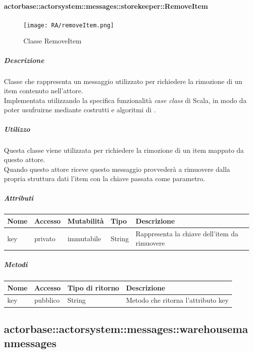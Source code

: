 \documentclass{scalatekids-article}
\begin{document}
\paragraph{actorbase::actorsystem::messages::storekeeper::RemoveItem}
\label{sec:actorbase::actorsystem::messages::storekeeper::RemoveItem}

\begin{figure}[H]
  \begin{center}
    \texttt{[image: RA/removeItem.png]}
    \caption{Classe RemoveItem}
  \end{center}
\end{figure}

\subparagraph{Descrizione}
Classe che rappresenta un messaggio utilizzato per richiedere la rimozione di un
item contenuto nell'attore.\\Implementata utilizzando la specifica funzionalità
\textit{case class} di Scala,
in modo da poter usufruirne mediante costrutti e algoritmi di
.

\subparagraph{Utilizzo}
Questa classe viene utilizzata per richiedere la rimozione di un
item mappato da questo attore.\\Quando questo attore riceve questo
messaggio provvederà a rimuovere dalla propria struttura dati l'item con la
chiave passata come parametro.

\subparagraph{Attributi}
\begin{tabular}{| p{2cm} | p{1.5cm} | p{2cm} | p{3cm} | p{8.5cm} |}
  \hline
  Nome & Accesso & Mutabilità & Tipo & Descrizione\\
  \hline
  key & privato & immutabile & String & Rappresenta la chiave dell'item da rimuovere\\
  \hline
\end{tabular}

\subparagraph{Metodi}
\begin{tabular}{| l | l | l | l |}
  \hline
  Nome & Accesso & Tipo di ritorno & Descrizione\\
  \hline
  key & pubblico & String & Metodo che ritorna l'attributo key\\
  \hline
\end{tabular}


\subsection{actorbase::actorsystem::messages::warehousemanmessages}
\label{sec:actorbase::actorsystem::messages::warehousemanmessages}
\end{document}
